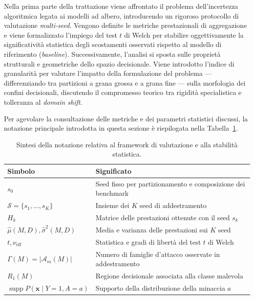 Nella prima parte della trattazione viene affrontato il problema dell'incertezza algoritmica legata ai modelli ad albero, introducendo un rigoroso protocollo di valutazione \textit{multi-seed}. 
Vengono definite le metriche prestazionali di aggregazione e viene formalizzato l'impiego del test $t$ di Welch per stabilire oggettivamente la significatività statistica degli scostamenti osservati rispetto al modello di riferimento (\textit{baseline}). 
Successivamente, l'analisi si sposta sulle proprietà strutturali e geometriche dello spazio decisionale. 
Viene introdotto l'indice di granularità per valutare l'impatto della formulazione del problema — differenziando tra partizioni a grana grossa e a grana fine — sulla morfologia dei confini decisionali, discutendo il compromesso teorico tra rigidità specialistica e tolleranza al \textit{domain shift}.

Per agevolare la consultazione delle metriche e dei parametri statistici discussi, la notazione principale introdotta in questa sezione è riepilogata nella Tabella~\ref{tab:notazione_valutazione}.

\begin{table}[H]
    \centering
    \small
    \caption{Sintesi della notazione relativa al framework di valutazione e alla stabilità statistica.}
    \label{tab:notazione_valutazione}
    \begin{tabularx}{\textwidth}{
        l
        >{\raggedright\arraybackslash}X
    }
        \toprule
        \textbf{Simbolo} & \textbf{Significato} \\
        \midrule

        $s_0$ &
        Seed fisso per partizionamento e composizione dei benchmark \\

        $\mathcal{S} = \{s_1, \dots, s_K\}$ &
        Insieme dei $K$ seed di addestramento \\

        $H_k$ &
        Matrice delle prestazioni ottenute con il seed $s_k$ \\

        $\hat{\mu}(M,D), \hat{\sigma}^2(M,D)$ &
        Media e varianza delle prestazioni sui $K$ seed \\

        $t, \nu_{\text{eff}}$ &
        Statistica e gradi di libertà del test $t$ di Welch \\

        $\Gamma(M) = |\mathcal{A}_m(M)|$ &
        Numero di famiglie d'attacco osservate in addestramento \\

        $R_1(M)$ &
        Regione decisionale associata alla classe malevola \\

        $\operatorname{supp} P(\mathbf{x} \mid Y=1, A=a)$ &
        Supporto della distribuzione della minaccia $a$ \\

        \bottomrule
    \end{tabularx}
\end{table}

